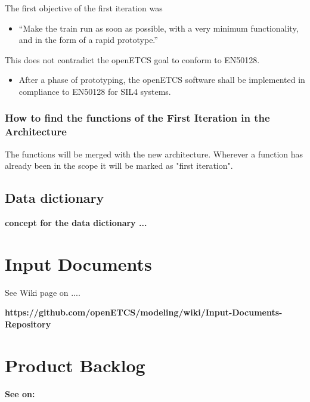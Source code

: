 \documentclass{template/openetcs_report}
\begin{document}
The first objective of the first iteration was
\begin{itemize}
	\item ``Make the train run as soon as possible, with a very minimum functionality, and in the form of a rapid prototype.''
\end{itemize}
This does not contradict the openETCS goal to conform to EN50128.
\begin{itemize}
	\item After a phase of prototyping, the openETCS software shall be implemented in compliance to EN50128 for SIL4 systems.
\end{itemize}

\subsection{How to find the functions of the First Iteration in the Architecture}
The functions will be merged with the new architecture. Wherever a function has already been in the scope it will be marked as "first iteration".




\glsaddall
\printglossaries


\section{Data dictionary}
\textbf{concept for the data dictionary ...}\\

\chapter{Input Documents}
See Wiki page on ....

\textbf{https://github.com/openETCS/modeling/wiki/Input-Documents-Repository}\\


\chapter{Product Backlog}
\textbf{See on:}\\ 
\end{document}
